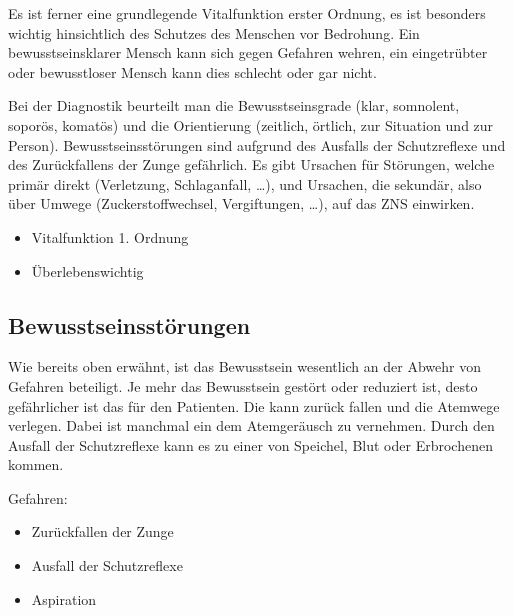 { Es ist ferner eine grundlegende Vitalfunktion erster
Ordnung, es ist besonders wichtig hinsichtlich des
Schutzes des Menschen vor Bedrohung. Ein bewusstseinsklarer
Mensch kann sich gegen Gefahren wehren, ein eingetrübter
oder bewusstloser Mensch kann dies schlecht oder gar nicht. 

Bei der Diagnostik beurteilt man die
Bewusstseinsgrade (klar, somnolent, soporös, komatös) und
die Orientierung (zeitlich, örtlich, zur Situation und zur
Person). Bewusstseinsstörungen sind aufgrund des Ausfalls
der Schutzreflexe und des Zurückfallens der Zunge
gefährlich. Es gibt Ursachen für Störungen, welche primär
direkt (Verletzung, Schlaganfall, \ldots), und Ursachen, die
sekundär, also über Umwege (Zuckerstoffwechsel,
Vergiftungen, \ldots), auf das ZNS einwirken.

}{
\begin{itemize}
  \item Vitalfunktion 1. Ordnung
  \item Überlebenswichtig
\end{itemize}
}{}{}{}


\subsection{Bewusstseinsstörungen}
\label{topic:bewusstseinsstoerung}

{%
Wie bereits oben erwähnt, ist das Bewusstsein wesentlich an
der Abwehr von Gefahren beteiligt. Je mehr das Bewusstsein
gestört oder reduziert ist, desto gefährlicher ist das für
den Patienten.
Die  kann zurück fallen und die Atemwege verlegen.
Dabei ist manchmal ein dem 
Atemgeräusch zu vernehmen.
Durch den Ausfall  der
Schutzreflexe kann es zu einer
 von Speichel, Blut oder
Erbrochenen kommen. 
}{%
Gefahren:
\begin{itemize}
  \item Zurückfallen der Zunge
  \item Ausfall der Schutzreflexe
  \item Aspiration
\end{itemize}
}{}{}{}

